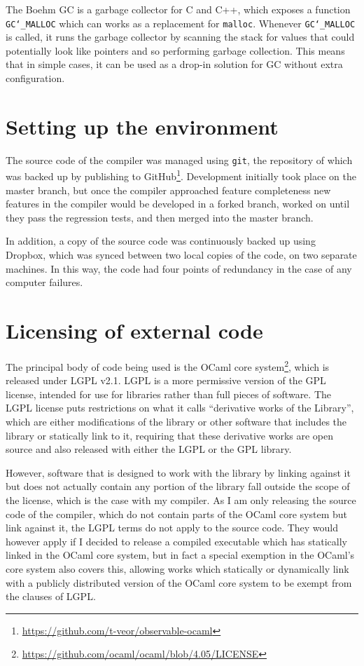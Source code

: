 The Boehm GC is a garbage collector for C and C++, which exposes a function
\texttt{GC\char`_MALLOC} which can works as a replacement for \texttt{malloc}.
Whenever \texttt{GC\char`_MALLOC} is called, it runs the garbage collector by
scanning the stack for values that could potentially look like pointers and so
performing garbage collection. This means that in simple cases, it can be used
as a drop-in solution for GC without extra configuration.

\section{Setting up the environment}

The source code of the compiler was managed using \texttt{git}, the repository
of which was backed up by publishing to
GitHub\footnote{\url{https://github.com/t-veor/observable-ocaml}}. Development
initially took place on the master branch, but once the compiler approached
feature completeness new features in the compiler would be developed in a forked
branch, worked on until they pass the regression tests, and then merged into the
master branch.

In addition, a copy of the source code was continuously backed up using Dropbox,
which was synced between two local copies of the code, on two separate machines.
In this way, the code had four points of redundancy in the case of any computer
failures.

\section{Licensing of external code}

The principal body of code being used is the OCaml core
system\footnote{\url{https://github.com/ocaml/ocaml/blob/4.05/LICENSE}}, which
is released under LGPL v2.1. LGPL is a more permissive version of the GPL
license, intended for use for libraries rather than full pieces of software. The
LGPL license puts restrictions on what it calls ``derivative works of the
Library'', which are either modifications of the library or other software that
includes the library or statically link to it, requiring that these derivative
works are open source and also released with either the LGPL or the GPL library.

However, software that is designed to work with the library by linking against
it but does not actually contain any portion of the library fall outside the
scope of the license, which is the case with my compiler. As I am only releasing
the source code of the compiler, which do not contain parts of the OCaml core
system but link against it, the LGPL terms do not apply to the source code. They
would however apply if I decided to release a compiled executable which has
statically linked in the OCaml core system, but in fact a special exemption in
the OCaml's core system also covers this, allowing works which statically or
dynamically link with a publicly distributed version of the OCaml core system
to be exempt from the clauses of LGPL.

